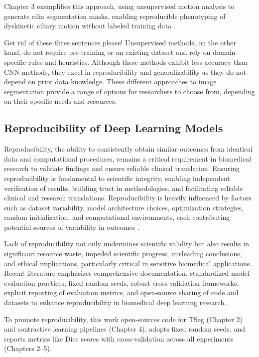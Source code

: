 \documentclass[./dissertation.tex]{subfiles}
\begin{document}
\textcolor{BulldogRed}{Chapter 3 exemplifies this approach, using unsupervised motion analysis to generate cilia segmentation masks, enabling reproducible phenotyping of dyskinetic ciliary motion without labeled training data \cite{vaezi2024training}.}

\textcolor{Hedges}{Get rid of these three sentences please!}
Unsupervised methods, on the other hand, do not require pre-training or an existing dataset and rely on domain-specific rules and heuristics. Although these methods exhibit less accuracy than CNN methods, they excel in reproducibility and generalizability as they do not depend on prior data knowledge. These different approaches to image segmentation provide a range of options for researchers to choose from, depending on their specific needs and resources.

\textcolor{BulldogRed}{\subsection{Reproducibility of Deep Learning Models}}
\textcolor{BulldogRed}{Reproducibility, the ability to consistently obtain similar outcomes from identical data and computational procedures, remains a critical requirement in biomedical research to validate findings and ensure reliable clinical translation. Ensuring reproducibility is fundamental to scientific integrity, enabling independent verification of results, building trust in methodologies, and facilitating reliable clinical and research translations. Reproducibility is heavily influenced by factors such as dataset variability, model architecture choices, optimization strategies, random initialization, and computational environments, each contributing potential sources of variability in outcomes \cite{maier2018rankings}.}

\textcolor{BulldogRed}{Lack of reproducibility not only undermines scientific validity but also results in significant resource waste, impeded scientific progress, misleading conclusions, and ethical implications, particularly critical in sensitive biomedical applications. Recent literature emphasizes comprehensive documentation, standardized model evaluation practices, fixed random seeds, robust cross-validation frameworks, explicit reporting of evaluation metrics, and open-source sharing of code and datasets to enhance reproducibility in biomedical deep learning research.}

\textcolor{BulldogRed}{To promote reproducibility, this work open-sources code for TSeg (Chapter 2) and contrastive learning pipelines (Chapter 4), adopts fixed random seeds, and reports metrics like Dice scores with cross-validation across all experiments (Chapters 2–5).}
\end{document}
